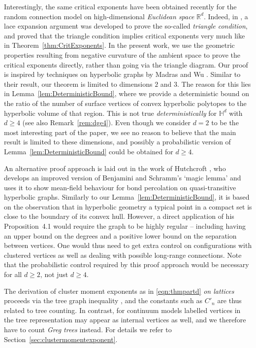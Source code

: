 \documentclass[10pt,a4paper,dvipsnames]{article}
\theoremstyle{definition}
\theoremstyle{remark}
\newcommand{\Rd}{\mathbb R^d}
\newcommand{\HypDim}{{\mathbb{H}^d}}
\numberwithin{equation}{section}
\begin{document}
Interestingly, the same critical exponents have been obtained recently for the random connection model on high-dimensional \emph{Euclidean space} $\Rd$. Indeed, in \cite{HeyHofLasMat19}, a lace expansion argument was developed to prove the so-called \emph{triangle condition}, and \cite{caicedo2023critical} proved that the triangle condition implies critical exponents very much like in Theorem~\ref{thm:CritExponents}. 
In the present work, we use the geometric properties resulting from negative curvature of the ambient space to prove the critical exponents directly, rather than going via the triangle diagram. 
Our proof is inspired by techniques on hyperbolic graphs by Madras and Wu \cite{madras2010trees}. 
Similar to their result, our theorem is limited to dimensions $2$ and $3$. The reason for this lies in Lemma~\ref{lem:DeterministicBound}, where we provide a deterministic bound on the ratio of the number of surface vertices of convex hyperbolic polytopes to the hyperbolic volume of that region. This is not true \emph{deterministically} for $\HypDim$ with $d\ge4$ (see also Remark~\ref{rem:dge4}). Even though we consider $d=2$ to be the most interesting part of the paper, we see no reason to believe that the main result is limited to these dimensions, and possibly a probabilistic version of Lemma~\ref{lem:DeterministicBound} could be obtained for $d\ge4$. 

An alternative proof approach is laid out in the work of Hutchcroft \cite{Hutch19}, who develops an improved version of Benjamini and Schramm's `magic lemma' \cite{benjaminischramm2001recurrence} and uses it to show mean-field behaviour for bond percolation on quasi-transitive hyperbolic graphs. Similarly to our Lemma~\ref{lem:DeterministicBound}, it is based on the observation that in hyperbolic geometry a typical point in a compact set is close to the boundary of its convex hull. However, a direct application of his Proposition~4.1 would require the graph to be highly regular -- including having an upper bound on the degrees and a positive lower bound on the separation between vertices. One would thus need to get extra control on configurations with clustered vertices as well as dealing with possible long-range connections. Note that the probabilistic control required by this proof approach would be necessary for all $d\geq 2$, not just $d\geq 4$.

The derivation of cluster moment exponents as in \eqref{eqn:thmpartd} \emph{on lattices} proceeds via the tree graph inequality \cite{Ngu87}, and the constants such as $C'_n$ are thus related to tree counting. In contrast, for continuum models labelled vertices in the tree representation may appear as internal vertices as well, and we therefore have to count \emph{Greg trees} instead. For details we refer to Section~\ref{sec:clustermomentexponent}.
\end{document}

